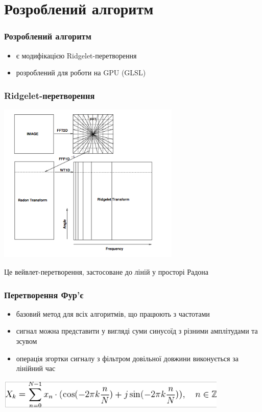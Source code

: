 \documentclass[12pt]{beamer}
\begin{document}
\section{Розроблений алгоритм}
\begin{frame}\frametitle{Розроблений алгоритм}
	\begin{itemize}
		\item є модифікацією Ridgelet-перетворення
		\item розроблений для роботи на GPU (GLSL)
	\end{itemize}
\end{frame}
\begin{frame}\frametitle{Ridgelet-перетворення }
	\begin{center}
	\includegraphics[width=0.65\textwidth]{images/ridgelet}
	\end{center}
	\linebreak Це вейвлет-перетворення, застосоване до ліній у просторі Радона
		 
\end{frame}
\begin{frame}\frametitle{Перетворення Фур'є}
	\begin{itemize}
		\item базовий метод для всіх алгоритмів, що працюють з частотами   
		\item сигнал можна представити у вигляді суми синусоїд з різними амплітудами та зсувом
		\item операція згортки сигналу з фільтром довільної довжини виконується за лінійний час
	\end{itemize}
	\includegraphics[scale=0.5]{images/fourier_1d} 
\end{frame}
\end{document}
